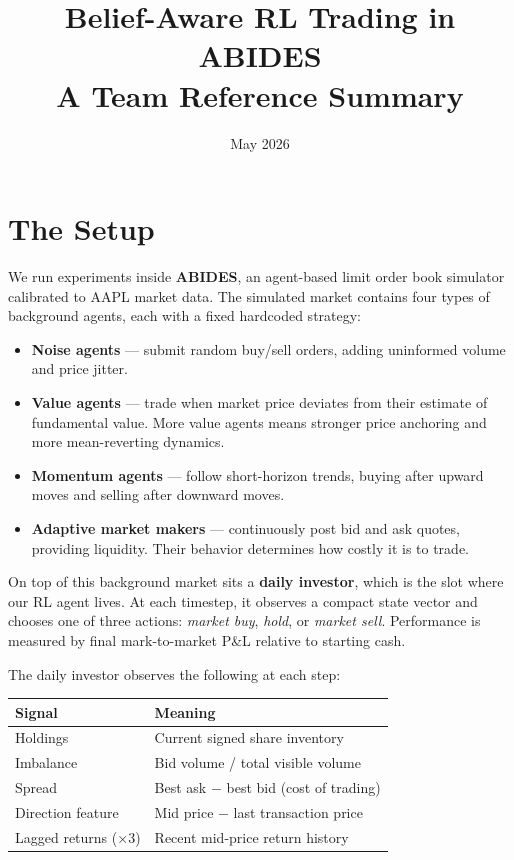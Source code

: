 \documentclass[11pt]{article}
\title{\textbf{Belief-Aware RL Trading in ABIDES} \\ \large A Team Reference Summary}
\author{}
\date{May 2026}
\begin{document}
\maketitle

\section{The Setup}

We run experiments inside \textbf{ABIDES}, an agent-based limit order book simulator calibrated to AAPL market data. The simulated market contains four types of background agents, each with a fixed hardcoded strategy:

\begin{itemize}
    \item \textbf{Noise agents} --- submit random buy/sell orders, adding uninformed volume and price jitter.
    \item \textbf{Value agents} --- trade when market price deviates from their estimate of fundamental value. More value agents means stronger price anchoring and more mean-reverting dynamics.
    \item \textbf{Momentum agents} --- follow short-horizon trends, buying after upward moves and selling after downward moves.
    \item \textbf{Adaptive market makers} --- continuously post bid and ask quotes, providing liquidity. Their behavior determines how costly it is to trade.
\end{itemize}

On top of this background market sits a \textbf{daily investor}, which is the slot where our RL agent lives. At each timestep, it observes a compact state vector and chooses one of three actions: \textit{market buy}, \textit{hold}, or \textit{market sell}. Performance is measured by final mark-to-market P\&L relative to starting cash.

The daily investor observes the following at each step:

\begin{center}
\begin{tabular}{ll}
\toprule
\textbf{Signal} & \textbf{Meaning} \\
\midrule
Holdings & Current signed share inventory \\
Imbalance & Bid volume / total visible volume \\
Spread & Best ask $-$ best bid (cost of trading) \\
Direction feature & Mid price $-$ last transaction price \\
Lagged returns (×3) & Recent mid-price return history \\
\bottomrule
\end{tabular}
\end{center}
\end{document}
